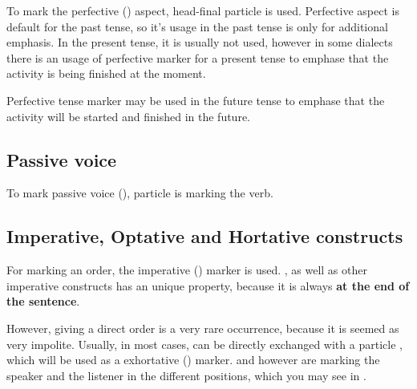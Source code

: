 To mark the perfective (\Pfv{}) aspect, head-final  particle is used.
Perfective aspect is default for the past tense, so it's usage in the past tense
is only for additional emphasis. In the present tense, it is usually not used,
however in some dialects there is an usage of perfective marker for a present
tense to emphase that the activity is being finished at the moment.

Perfective tense marker may be used in the future tense to emphase that the
activity will be started and finished in the future.





\subsection{Passive voice}

To mark passive voice (\Pass{}),  particle is marking the verb.


\subsection{Imperative, Optative and Hortative constructs}

For marking an order, the imperative (\Imp{}) marker  is used.
, as well as other imperative constructs has an unique property,
because it is always \textbf{at the end of the sentence}.


However, giving a direct order is a very rare occurrence, because it is seemed as
very impolite. Usually, in most cases,  can be directly exchanged
with a particle , which will be used as a exhortative (\Exh{})
marker.  and  however are marking the speaker and the
listener in the different positions, which you may see in
.

